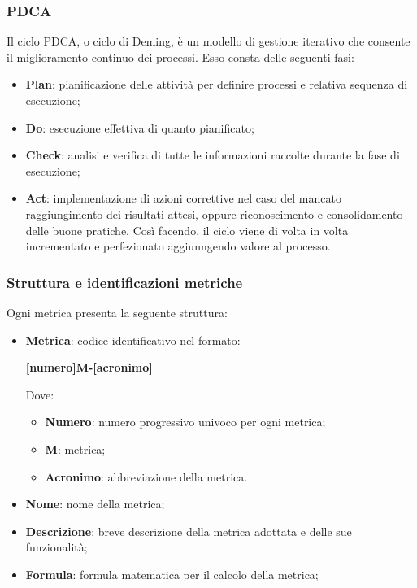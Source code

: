 \subsubsection{PDCA}
Il ciclo PDCA, o ciclo di Deming, è un modello di gestione iterativo che consente il miglioramento continuo dei processi. Esso consta delle seguenti fasi:
\begin{itemize}
	\item \textbf{Plan}: pianificazione delle attività per definire processi e relativa sequenza di esecuzione;
	\item \textbf{Do}: esecuzione effettiva di quanto pianificato;
	\item \textbf{Check}: analisi e verifica di tutte le informazioni raccolte durante la fase di esecuzione;
	\item \textbf{Act}: implementazione di azioni correttive nel caso del mancato raggiungimento dei risultati attesi, oppure riconoscimento e
	      consolidamento delle buone pratiche. Così facendo, il ciclo viene di volta in volta incrementato e perfezionato aggiunngendo valore al processo.
\end{itemize}

\subsubsection{Struttura e identificazioni metriche}
Ogni metrica presenta la seguente struttura:
\begin{itemize}
	\item \textbf{Metrica}:
	      codice identificativo nel formato:
	      \begin{center}
		      \textbf{[numero]M-[acronimo]}
	      \end{center}
	      Dove:
	      \begin{itemize}
		      \item \textbf{Numero}: numero progressivo univoco per ogni metrica;
		      \item \textbf{M}: metrica;
		      \item \textbf{Acronimo}: abbreviazione della metrica.
	      \end{itemize}
	\item \textbf{Nome}: nome della metrica;
	\item \textbf{Descrizione}: breve descrizione della metrica adottata e delle sue funzionalità;
	\item \textbf{Formula}: formula matematica per il calcolo della metrica;
\end{itemize}

